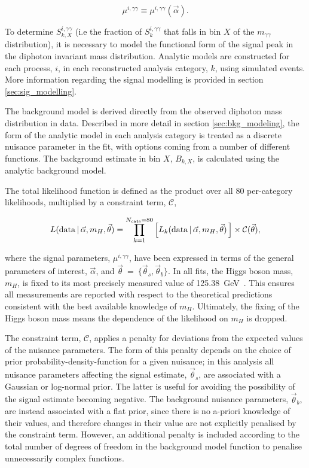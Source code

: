 \begin{equation}
    \mu^{i,\gamma\gamma} \equiv \mu^{i,\gamma\gamma}(\vec{\alpha}).
\end{equation}

To determine $S_{k,X}^{i,\gamma\gamma}$ (i.e the fraction of $S_k^{i,\gamma\gamma}$ that falls in bin $X$ of the $m_{\gamma\gamma}$ distribution), it is necessary to model the functional form of the signal peak in the diphoton invariant mass distribution. Analytic models are constructed for each process, $i$, in each reconstructed analysis category, $k$, using simulated events. More information regarding the signal modelling is provided in section \ref{sec:sig_modelling}.

The background model is derived directly from the observed diphoton mass distribution in data. Described in more detail in section \ref{sec:bkg_modeling}, the form of the analytic model in each analysis category is treated as a discrete nuisance parameter in the fit, with options coming from a number of different functions. The background estimate in bin $X$, $B_{k,X}$, is calculated using the analytic background model.

The total likelihood function is defined as the product over all 80 per-category likelihoods, multiplied by a constraint term, $\mathcal{C}$,

\begin{equation}
    L({\rm{data}}\,|\,\vec{\alpha},m_H,\vec{\theta}) = \prod_{k=1}^{N_{\rm{cats}}=80} \Big[    L_k({\rm{data}}\,|\,\vec{\alpha},m_H,\vec{\theta}) \,\Big] \times \mathcal{C}(\vec{\theta}) ,
\end{equation}

\noindent
where the signal parameters, $\mu^{i,\gamma\gamma}$, have been expressed in terms of the general parameters of interest, $\vec{\alpha}$, and $\vec{\theta}$~=~$\{\vec{\theta}_s,\vec{\theta}_b\}$. In all fits, the Higgs boson mass, $m_H$, is fixed to its most precisely measured value of 125.38~GeV~\cite{Sirunyan:2020xwk}. This ensures all measurements are reported with respect to the theoretical predictions consistent with the best available knowledge of $m_H$. Ultimately, the fixing of the Higgs boson mass means the dependence of the likelihood on $m_H$ is dropped.

The constraint term, $\mathcal{C}$, applies a penalty for deviations from the expected values of the nuisance parameters. The form of this penalty depends on the choice of prior probability-density-function for a given nuisance; in this analysis all nuisance parameters affecting the signal estimate, $\vec{\theta}_s$, are associated with a Gaussian or log-normal prior. The latter is useful for avoiding the possibility of the signal estimate becoming negative. The background nuisance parameters, $\vec{\theta}_b$, are instead associated with a flat prior, since there is no a-priori knowledge of their values, and therefore changes in their value are not explicitly penalised by the constraint term. However, an additional penalty is included according to the total number of degrees of freedom in the background model function to penalise unnecessarily complex functions.

